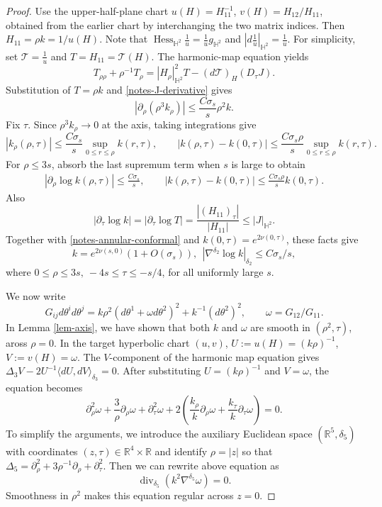 \documentclass[letterpaper]{amsart}
\theoremstyle{definition}
\theoremstyle{remark}
\begin{document}
\begin{proof}
Use the upper-half-plane chart $u(H)=H_{11}^{-1}$, $v(H)=H_{12}/H_{11}$, obtained from the earlier chart by interchanging the two matrix indices. Then $H_{11}=\rho k=1/u(H)$. Note that $\operatorname{Hess}_{\mathbb H^2}\frac{1}{u}= \frac{1}{u} g_{\mathbb H^2}$
and $|d \frac{1}{u}|_{\mathbb H^2}=\frac{1}{u}$. For simplicity, set $\mathcal{T} = \frac{1}{u}$ and $T = H_{11} = \mathcal{T}(H)$.
The harmonic-map equation yields
\[
 T_{\rho\rho}+\rho^{-1}T_\rho
 =|H_\rho|_{\mathbb H^2}^2T-(d \mathcal{T})_H(D_\tau J).
\]
Substitution of $T=\rho k$ and \eqref{notes-J-derivative} gives
\[
 \left|\partial_\rho(\rho^3k_\rho)\right|
 \le \frac{C\sigma_s}{s}\rho^2k.
\]
Fix $\tau$. Since $\rho^3k_\rho\to0$ at the axis, taking integrations give
\[
 |k_\rho(\rho,\tau)|\le\frac{C\sigma_s}{s}
       \sup_{0\le r\le\rho}k(r,\tau),\qquad
 |k(\rho,\tau)-k(0,\tau)|\le\frac{C\sigma_s\rho}{s}
       \sup_{0\le r\le\rho}k(r,\tau).
\]
For $\rho\le3s$, absorb the last supremum term when $s$ is large to obtain 
\begin{align*}
	|\partial _{\rho } \log k(\rho,\tau)|\le\frac{C\sigma_s}{s},\qquad |k(\rho , \tau ) - k(0, \tau )| \leq \frac{C \sigma _s \rho }{s} k(0, \tau ).
\end{align*} 
Also 
$$|\partial_\tau\log k|=|\partial_\tau\log T| = \frac{|(H_{11})_{\tau }|}{|H_{11}|}\le|J|_{\mathbb H^2}.$$
Together with \eqref{notes-annular-conformal} and $k(0, \tau ) = e ^{2 \nu (0, \tau )}$, these facts give
\begin{equation}\label{notes-k-control}
 k=e^{2\nu(s,0)}(1+O(\sigma_s)),\ \ 
 |\nabla^{\delta_2}\log k|_{\delta_2}\le C\sigma_s/s,
\end{equation}
where $ 0 \leq \rho \leq 3 s,\ -4s \leq \tau \leq - s /4$, for all uniformly large $s$.


We now write
\begin{equation}\label{notes-axis-gram}
 G_{ij}d\theta^i d\theta^j
 =k\rho^2(d\theta^1+\omega d\theta^2)^2+k^{-1}(d\theta^2)^2,
 \qquad \omega=G_{12}/G_{11}.
\end{equation}
In Lemma \ref{lem-axis}, we have shown that both $k$ and $\omega$ are smooth in $(\rho^2,\tau)$, aross $\rho =0$.
In the target hyperbolic chart $(u,v)$, $U:=u(H)=(k\rho)^{-1}$, $V:=v(H)=\omega$. The $V$-component of the harmonic map equation gives
$\Delta_3V-2U^{-1}\langle dU,dV\rangle_{\delta_3}=0$. After substituting \(U=(k\rho)^{-1}\) and \(V=\omega\), the equation becomes
\[
\partial_\rho^2\omega+\frac3\rho\partial_\rho\omega+\partial_\tau^2\omega
+2\left(\frac{k_\rho}{k}\partial_\rho\omega+
\frac{k_\tau}{k}\partial_\tau\omega\right)=0.
\] 
To simplify the arguments, we introduce the auxiliary Euclidean space  $(\mathbb{R}^5, \delta _5)$ with coordinates $(z,\tau)\in\mathbb R^4\times\mathbb R$ and identify 
$\rho=|z|$ so that $\Delta_5=\partial_\rho^2+3\rho^{-1}\partial_\rho+\partial_\tau^2$. Then we can rewrite above equation as 
\begin{equation}\label{notes-five-equation}
 \operatorname{div}_{\delta_5}(k^2\nabla^{\delta_5}\omega)=0.
\end{equation}
Smoothness in $\rho^2$
makes this equation regular across $z=0$.


\end{proof}
\end{document}
